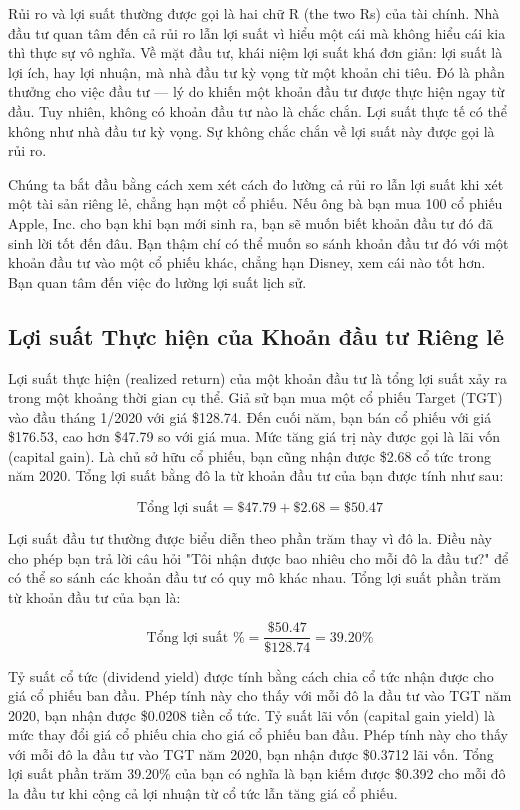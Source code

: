 Rủi ro và lợi suất thường được gọi là hai chữ R (the two Rs) của tài chính. Nhà đầu tư quan tâm đến cả rủi ro lẫn lợi suất vì hiểu một cái mà không hiểu cái kia thì thực sự vô nghĩa. Về mặt đầu tư, khái niệm lợi suất khá đơn giản: lợi suất là lợi ích, hay lợi nhuận, mà nhà đầu tư kỳ vọng từ một khoản chi tiêu. Đó là phần thưởng cho việc đầu tư — lý do khiến một khoản đầu tư được thực hiện ngay từ đầu. Tuy nhiên, không có khoản đầu tư nào là chắc chắn. Lợi suất thực tế có thể không như nhà đầu tư kỳ vọng. Sự không chắc chắn về lợi suất này được gọi là rủi ro.

Chúng ta bắt đầu bằng cách xem xét cách đo lường cả rủi ro lẫn lợi suất khi xét một tài sản riêng lẻ, chẳng hạn một cổ phiếu. Nếu ông bà bạn mua 100 cổ phiếu Apple, Inc. cho bạn khi bạn mới sinh ra, bạn sẽ muốn biết khoản đầu tư đó đã sinh lời tốt đến đâu. Bạn thậm chí có thể muốn so sánh khoản đầu tư đó với một khoản đầu tư vào một cổ phiếu khác, chẳng hạn Disney, xem cái nào tốt hơn. Bạn quan tâm đến việc đo lường lợi suất lịch sử.

\subsection*{Lợi suất Thực hiện của Khoản đầu tư Riêng lẻ}

Lợi suất thực hiện (realized return) của một khoản đầu tư là tổng lợi suất xảy ra trong một khoảng thời gian cụ thể. Giả sử bạn mua một cổ phiếu Target (TGT) vào đầu tháng 1/2020 với giá \$128.74. Đến cuối năm, bạn bán cổ phiếu với giá \$176.53, cao hơn \$47.79 so với giá mua. Mức tăng giá trị này được gọi là lãi vốn (capital gain). Là chủ sở hữu cổ phiếu, bạn cũng nhận được \$2.68 cổ tức trong năm 2020. Tổng lợi suất bằng đô la từ khoản đầu tư của bạn được tính như sau:

$$
\text{Tổng lợi suất} = \$47.79 + \$2.68 = \$50.47
$$

Lợi suất đầu tư thường được biểu diễn theo phần trăm thay vì đô la. Điều này cho phép bạn trả lời câu hỏi "Tôi nhận được bao nhiêu cho mỗi đô la đầu tư?" để có thể so sánh các khoản đầu tư có quy mô khác nhau. Tổng lợi suất phần trăm từ khoản đầu tư của bạn là:

$$
\text{Tổng lợi suất \%} = \frac{\$50.47}{\$128.74} = 39.20\%
$$

Tỷ suất cổ tức (dividend yield) được tính bằng cách chia cổ tức nhận được cho giá cổ phiếu ban đầu. Phép tính này cho thấy với mỗi đô la đầu tư vào TGT năm 2020, bạn nhận được \$0.0208 tiền cổ tức. Tỷ suất lãi vốn (capital gain yield) là mức thay đổi giá cổ phiếu chia cho giá cổ phiếu ban đầu. Phép tính này cho thấy với mỗi đô la đầu tư vào TGT năm 2020, bạn nhận được \$0.3712 lãi vốn. Tổng lợi suất phần trăm 39.20\% của bạn có nghĩa là bạn kiếm được \$0.392 cho mỗi đô la đầu tư khi cộng cả lợi nhuận từ cổ tức lẫn tăng giá cổ phiếu.

